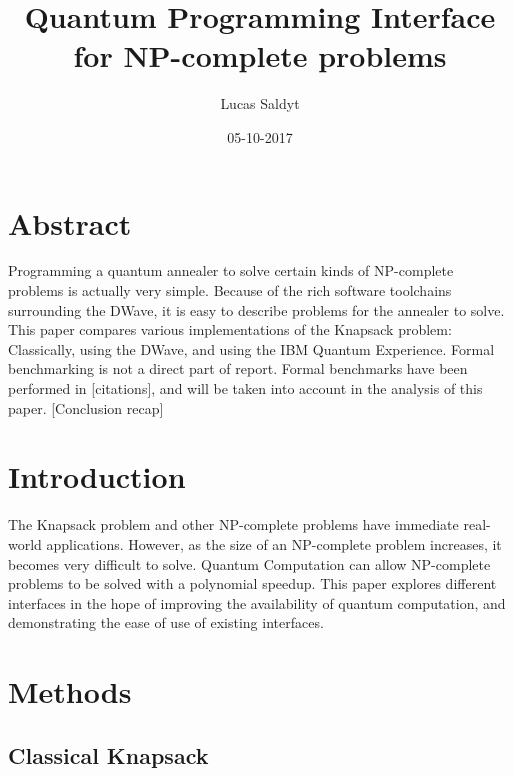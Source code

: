 \documentclass{article}
\title{Quantum Programming Interface for NP-complete problems}
\date{05-10-2017}
\author{Lucas Saldyt}
\begin{document}
\maketitle
{}
\newpage
{}

\section{Abstract}

Programming a quantum annealer to solve certain kinds of NP-complete problems is actually very simple.
Because of the rich software toolchains surrounding the DWave, it is easy to describe problems for the annealer to solve.
This paper compares various implementations of the Knapsack problem: Classically, using the DWave, and using the IBM Quantum Experience.
Formal benchmarking is not a direct part of report. Formal benchmarks have been performed in [citations], and will be taken into account in the analysis of this paper.
[Conclusion recap]

\section{Introduction}

The Knapsack problem and other NP-complete problems have immediate real-world applications. 
However, as the size of an NP-complete problem increases, it becomes very difficult to solve.
Quantum Computation can allow NP-complete problems to be solved with a polynomial speedup.
This paper explores different interfaces in the hope of improving the availability of quantum computation, and demonstrating the ease of use of existing interfaces.

\newpage

\section{Methods}

\subsection{Classical Knapsack}
\end{document}
